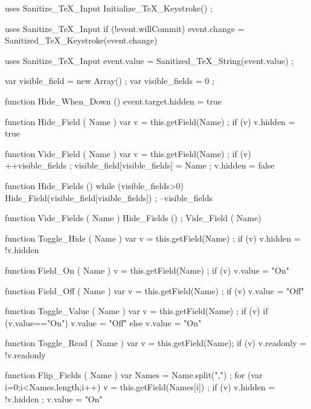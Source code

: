 \stopJSpreamble

 uses {Sanitize_TeX_Input}
  Initialize_TeX_Keystroke() ; 
\stopJScode

 uses {Sanitize_TeX_Input}
  if (!event.willCommit) 
    { event.change = Sanitized_TeX_Keystroke(event.change) }
\stopJScode

 uses {Sanitize_TeX_Input}
  event.value = Sanitized_TeX_String(event.value) ; 
\stopJScode


var visible_field  = new Array() ; %
var visible_fields = 0 ; 

function Hide_When_Down ()
  { event.target.hidden = true }

function Hide_Field ( Name ) 
  { var v = this.getField(Name) ; 
    if (v) { v.hidden = true } }

function Vide_Field ( Name ) 
  { var v = this.getField(Name) ;   
    if (v) 
      { ++visible_fields ; 
        visible_field[visible_fields] = Name ;  
        v.hidden = false } } 

function Hide_Fields () 
  { while (visible_fields>0)
      { Hide_Field(visible_field[visible_fields]) ;
        --visible_fields } } 

function Vide_Fields ( Name ) %
  { Hide_Fields () ; 
    Vide_Field ( Name) } 

function Toggle_Hide ( Name ) 
  { var v = this.getField(Name) ; 
    if (v) { v.hidden = !v.hidden } } 

function Field_On ( Name ) 
  { v = this.getField(Name) ; 
    if (v) { v.value = "On" } } 

function Field_Off ( Name ) 
  { var v = this.getField(Name) ; 
    if (v) { v.value = "Off" } }

function Toggle_Value ( Name ) 
  { var v = this.getField(Name) ;
    if (v) 
      { if (v.value=="On") 
          { v.value = "Off" }
        else 
          { v.value = "On" } } }

function Toggle_Read ( Name ) 
  { var v = this.getField(Name);   
    if (v) { v.readonly = !v.readonly } }

function Flip_Fields ( Name ) 
  { var Names = Name.split(",") ;
    for (var i=0;i<Names.length;i++)
      { v = this.getField(Names[i]) ; 
        if (v)  
          { v.hidden = !v.hidden ;
            v.value = "On" } } }

